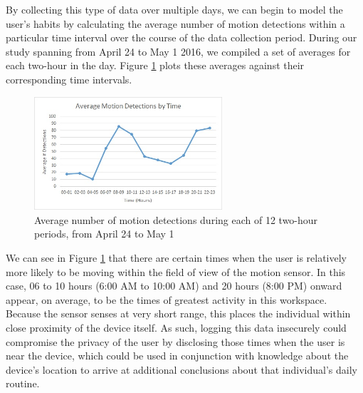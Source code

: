 \documentclass[conference]{IEEEtran}
\begin{document}
By collecting this type of data over multiple days, we can begin to model the user's habits by calculating the average number of motion detections within a particular time interval over the course of the data collection period.
During our study spanning from April 24 to May 1 2016, we compiled a set of averages for each two-hour in the day. Figure \ref{fig:chartavg} plots these averages against their corresponding time intervals.
\begin{figure}[!ht]
\centering
\includegraphics[width=2.75in]{images/Chart-averages.jpg}
\caption{Average number of motion detections during each of 12 two-hour periods, from April 24 to May 1}
\label{fig:chartavg}
\end{figure}

We can see in Figure \ref{fig:chartavg} that there are certain times when the user is relatively more likely to be moving within the field of view of the motion sensor.
In this case, 06 to 10 hours (6:00 AM to 10:00 AM) and 20 hours (8:00 PM) onward appear, on average, to be the times of greatest activity in this workspace.
Because the sensor senses at very short range, this places the individual within close proximity of the device itself.
As such, logging this data insecurely could compromise the privacy of the user by disclosing those times when the user is near the device, which could be used in conjunction with knowledge about the device's location to arrive at additional conclusions about that individual's daily routine.
\end{document}
